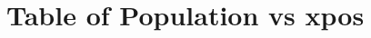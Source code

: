 \documentclass[11pt]{article}
\begin{document}
    \begin{center}
    \end{center}
    { \hspace*{\fill} \\}
    
    \begin{center}
    \end{center}
    { \hspace*{\fill} \\}
    
    \hypertarget{table-of-population-vs-xpos}{%
\section{Table of Population vs
xpos}\label{table-of-population-vs-xpos}}

    
\end{document}
